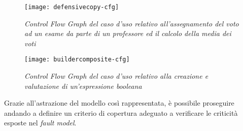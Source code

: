 \begin{figure}[h] 
  \centering
    \texttt{[image: defensivecopy-cfg]}
    \caption{{\small \textit{Control Flow Graph del caso d'uso relativo all'assegnamento del voto ad un esame da parte di un professore ed il calcolo della media dei voti}}}
\end{figure}

\begin{figure}[h] 
  \centering
    \texttt{[image: buildercomposite-cfg]}
    \caption{{\small \textit{Control Flow Graph del caso d'uso relativo alla creazione e valutazione di un'espressione booleana}}}
\end{figure}

Grazie all'astrazione del modello così rappresentata, è possibile proseguire andando a definire un criterio di copertura adeguato a verificare le criticità esposte nel \emph{fault model}.

